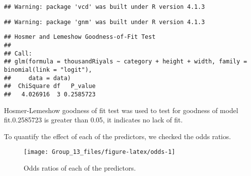 \documentclass[
]{article}
\begin{document}
\begin{verbatim}
## Warning: package 'vcd' was built under R version 4.1.3
\end{verbatim}

\begin{verbatim}
## Warning: package 'gnm' was built under R version 4.1.3
\end{verbatim}

\begin{verbatim}
## Hosmer and Lemeshow Goodness-of-Fit Test 
## 
## Call:
## glm(formula = thousandRiyals ~ category + height + width, family = binomial(link = "logit"), 
##     data = data)
##  ChiSquare df   P_value
##   4.026916  3 0.2585723
\end{verbatim}

Hosmer-Lemeshow goodness of fit test was used to test for goodness of
model fit.0.2585723 is greater than 0.05, it indicates no lack of fit.

To quantify the effect of each of the predictors, we checked the odds
ratios.

\begin{figure}[H]

\texttt{[image: Group\_13\_files/figure-latex/odds-1]} \hfill{}

\caption{\label{fig:odds} Odds ratios of each of the predictors.}\label{fig:odds}
\end{figure}
\end{document}
